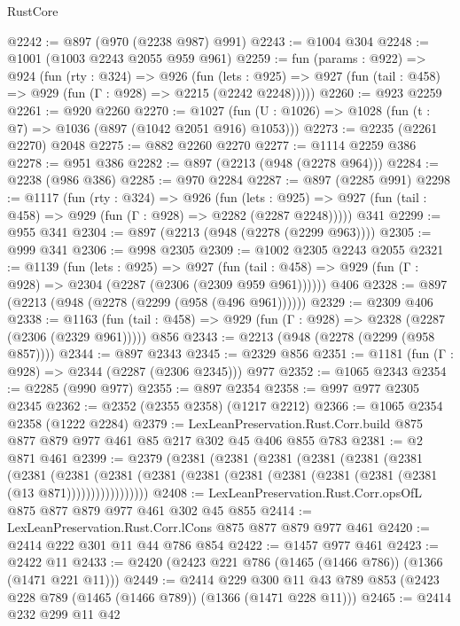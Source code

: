\begin{lexlean}{RustCore}
\begin{coremodule}
@2242 := @897 (@970 (@2238 @987) @991)
@2243 := @1004 @304
@2248 := @1001 (@1003 @2243 @2055 @959 @961)
@2259 := fun (params : @922) =>
  @924
    (fun (rty : @324) =>
    @926
      (fun (lets : @925) =>
      @927 (fun (tail : @458) => @929 (fun (Γ : @928) => @2215 (@2242 @2248)))))
@2260 := @923 @2259
@2261 := @920 @2260
@2270 := @1027 (fun (U : @1026) => @1028 (fun (t : @7) => @1036 (@897 (@1042 @2051 @916) @1053)))
@2273 := @2235 (@2261 @2270) @2048
@2275 := @882 @2260 @2270
@2277 := @1114 @2259 @386
@2278 := @951 @386
@2282 := @897 (@2213 (@948 (@2278 @964)))
@2284 := @2238 (@986 @386)
@2285 := @970 @2284
@2287 := @897 (@2285 @991)
@2298 := @1117
    (fun (rty : @324) =>
    @926
      (fun (lets : @925) =>
      @927 (fun (tail : @458) => @929 (fun (Γ : @928) => @2282 (@2287 @2248)))))
    @341
@2299 := @955 @341
@2304 := @897 (@2213 (@948 (@2278 (@2299 @963))))
@2305 := @999 @341
@2306 := @998 @2305
@2309 := @1002 @2305 @2243 @2055
@2321 := @1139
    (fun (lets : @925) =>
    @927 (fun (tail : @458) => @929 (fun (Γ : @928) => @2304 (@2287 (@2306 (@2309 @959 @961))))))
    @406
@2328 := @897 (@2213 (@948 (@2278 (@2299 (@958 (@496 @961))))))
@2329 := @2309 @406
@2338 := @1163
    (fun (tail : @458) => @929 (fun (Γ : @928) => @2328 (@2287 (@2306 (@2329 @961)))))
    @856
@2343 := @2213 (@948 (@2278 (@2299 (@958 @857))))
@2344 := @897 @2343
@2345 := @2329 @856
@2351 := @1181 (fun (Γ : @928) => @2344 (@2287 (@2306 @2345))) @977
@2352 := @1065 @2343
@2354 := @2285 (@990 @977)
@2355 := @897 @2354
@2358 := @997 @977 @2305 @2345
@2362 := @2352 (@2355 @2358) (@1217 @2212)
@2366 := @1065 @2354 @2358 (@1222 @2284)
@2379 := LexLeanPreservation.Rust.Corr.build
    @875
    @877
    @879
    @977
    @461
    @85
    @217
    @302
    @45
    @406
    @855
    @783
@2381 := @2 @871 @461
@2399 := @2379
    (@2381
      (@2381
        (@2381
          (@2381
            (@2381
              (@2381
                (@2381
                  (@2381
                    (@2381
                      (@2381 (@2381 (@2381 (@2381 (@2381 (@2381 (@2381 (@13 @871)))))))))))))))))
@2408 := LexLeanPreservation.Rust.Corr.opsOfL @875 @877 @879 @977 @461 @302 @45 @855
@2414 := LexLeanPreservation.Rust.Corr.lCons @875 @877 @879 @977 @461
@2420 := @2414 @222 @301 @11 @44 @786 @854
@2422 := @1457 @977 @461
@2423 := @2422 @11
@2433 := @2420 (@2423 @221 @786 (@1465 (@1466 @786)) (@1366 (@1471 @221 @11)))
@2449 := @2414
    @229
    @300
    @11
    @43
    @789
    @853
    (@2423 @228 @789 (@1465 (@1466 @789)) (@1366 (@1471 @228 @11)))
@2465 := @2414
    @232
    @299
    @11
    @42

\end{coremodule}
\end{lexlean}
